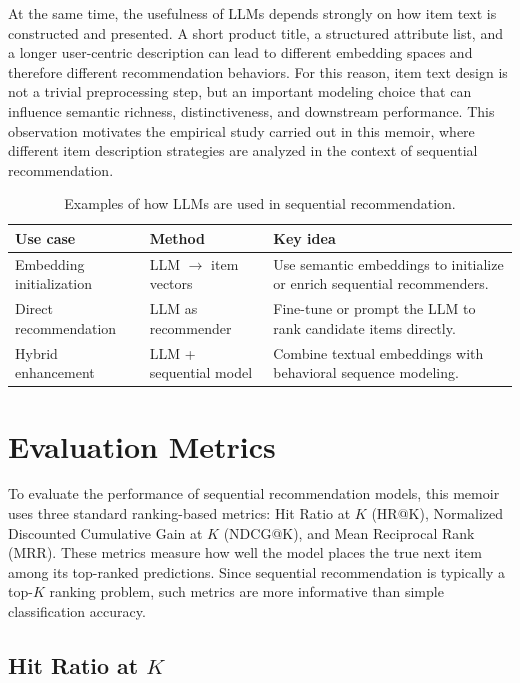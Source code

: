 \documentclass[12pt,a4paper]{report}
\begin{document}
At the same time, the usefulness of LLMs depends strongly on how item text is
constructed and presented. A short product title, a structured attribute list,
and a longer user-centric description can lead to different embedding spaces and
therefore different recommendation behaviors. For this reason, item text
design is not a trivial preprocessing step, but an important modeling choice
that can influence semantic richness, distinctiveness, and downstream
performance. This observation motivates the empirical study carried out in this
memoir, where different item description strategies are analyzed in the context
of sequential recommendation.

\begin{table}[h]
\centering
\begin{tabular}{p{3cm} p{3.5cm} p{6.3cm}}
\toprule
\textbf{Use case} & \textbf{Method} & \textbf{Key idea} \\
\midrule
Embedding initialization & LLM $\rightarrow$ item vectors & Use semantic embeddings to initialize or enrich sequential recommenders. \\
Direct recommendation & LLM as recommender & Fine-tune or prompt the LLM to rank candidate items directly. \\
Hybrid enhancement & LLM + sequential model & Combine textual embeddings with behavioral sequence modeling. \\
\bottomrule
\end{tabular}

\caption{Examples of how LLMs are used in sequential recommendation.}
\label{tab:llm_seq}
\end{table}


\section{Evaluation Metrics}

To evaluate the performance of sequential recommendation models, this memoir
uses three standard ranking-based metrics: Hit Ratio at \(K\) (HR@K),
Normalized Discounted Cumulative Gain at \(K\) (NDCG@K), and Mean Reciprocal
Rank (MRR). These metrics measure how well the model places the true next item
among its top-ranked predictions. Since sequential recommendation is typically a
top-\(K\) ranking problem, such metrics are more informative than simple
classification accuracy.

\subsection{Hit Ratio at \(K\)}
\end{document}

